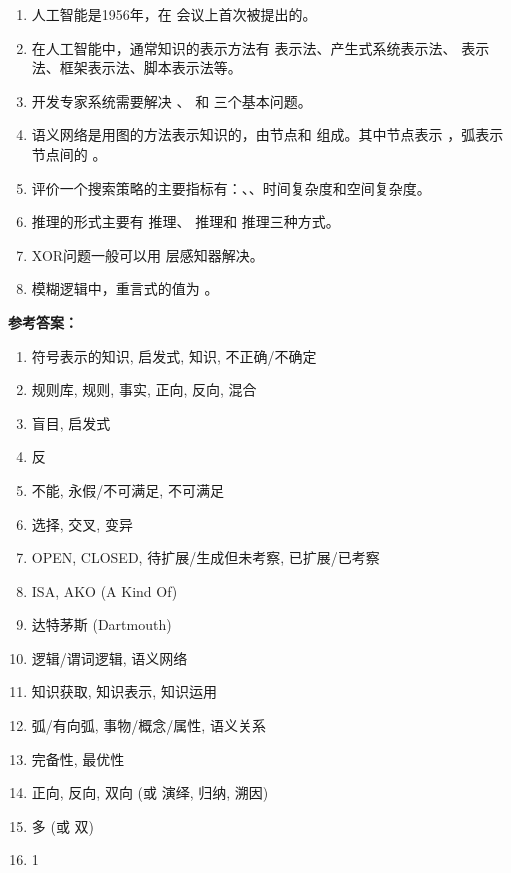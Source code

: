 \begin{enumerate}[leftmargin=2em,itemsep=1pt]
\item 人工智能是1956年，在 \underline{\hspace{4em}} 会议上首次被提出的。
\item 在人工智能中，通常知识的表示方法有 \underline{\hspace{4em}} 表示法、产生式系统表示法、\underline{\hspace{4em}} 表示法、框架表示法、脚本表示法等。
\item 开发专家系统需要解决 \underline{\hspace{4em}}、\underline{\hspace{4em}} 和 \underline{\hspace{4em}} 三个基本问题。
\item 语义网络是用图的方法表示知识的，由节点和 \underline{\hspace{4em}} 组成。其中节点表示 \underline{\hspace{4em}}，弧表示节点间的 \underline{\hspace{4em}}。
\item 评价一个搜索策略的主要指标有：\underline{\hspace{4em}}、\underline{\hspace{4em}}、时间复杂度和空间复杂度。
\item 推理的形式主要有 \underline{\hspace{4em}} 推理、\underline{\hspace{4em}} 推理和 \underline{\hspace{4em}} 推理三种方式。
\item XOR问题一般可以用 \underline{\hspace{4em}} 层感知器解决。
\item 模糊逻辑中，重言式的值为 \underline{\hspace{4em}}。
\end{enumerate}

\textbf{参考答案：}
\begin{enumerate}[label=\arabic*.]
\item 符号表示的知识, 启发式, 知识, 不正确/不确定
\item 规则库, 规则, 事实, 正向, 反向, 混合
\item 盲目, 启发式
\item 反
\item 不能, 永假/不可满足, 不可满足
\item 选择, 交叉, 变异
\item OPEN, CLOSED, 待扩展/生成但未考察, 已扩展/已考察
\item ISA, AKO (A Kind Of)
\item 达特茅斯 (Dartmouth)
\item 逻辑/谓词逻辑, 语义网络
\item 知识获取, 知识表示, 知识运用
\item 弧/有向弧, 事物/概念/属性, 语义关系
\item 完备性, 最优性
\item 正向, 反向, 双向 (或 演绎, 归纳, 溯因)
\item 多 (或 双)
\item 1
\end{enumerate}

